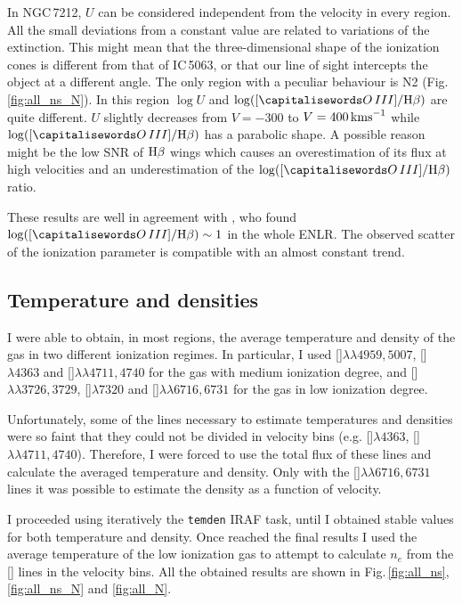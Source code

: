 \documentclass[../thesis.tex]{subfiles}
\begin{document}
In NGC\,7212, $U$ can be considered independent from the velocity in every region.
All the small deviations from a constant value are related to variations of the extinction.
This might mean that the three-dimensional shape of the ionization cones is different from that of IC\,5063, or that our line of sight intercepts the object at a different angle.
The only region with a peculiar behaviour is N2 (Fig.\,\ref{fig:all_ns_N}).
In this region $\log U$ and $\log([\ion{O}{III}]/\Hb)$ are quite different.
$U$ slightly decreases from $V=-300$ to $V= 400\,\si{\kms}$ while $\log([\ion{O}{III}]/\Hb)$ has a parabolic shape.
A possible reason might be the low SNR of $\Hb$ wings which causes an overestimation of its flux at high velocities and an underestimation of the $\log([\ion{O}{III}]/\Hb)$ ratio.

These results are well in agreement with \citet{Cracco11}, who found $\log([\ion{O}{III}]/\Hb)\sim1$ in the whole ENLR.
The observed scatter of the ionization parameter is compatible with an almost constant trend.



\subsection{Temperature and densities}

I were able to obtain, in most regions, the average temperature and density of the gas in two different ionization regimes.
In particular, I used []$\lambda\lambda4959,5007$, []$\lambda4363$ and  []$\lambda\lambda4711,4740$ for the gas with medium ionization degree, and []$\lambda\lambda3726,3729$, []$\lambda7320$ and  []$\lambda\lambda6716,6731$ for the gas in low ionization degree.

Unfortunately, some of the lines necessary to estimate temperatures and densities were so faint that they could not be divided in velocity bins (e.g. []$\lambda4363$, []$\lambda\lambda4711,4740$).
Therefore, I were forced to use the total flux of these lines and calculate the averaged temperature and density.
Only with the []$\lambda\lambda6716,6731$ lines it was possible to estimate the density as a function of velocity. 

I proceeded using iteratively the \verb!temden! IRAF task, until I obtained stable values for both temperature and density.
Once reached the final results I used the average temperature of the low ionization gas to attempt to calculate $n_e$ from the [] lines in the velocity bins.
All the obtained results are shown in Fig.\,\ref{fig:all_ns}, \ref{fig:all_ns_N} and \ref{fig:all_N}.
\end{document}
